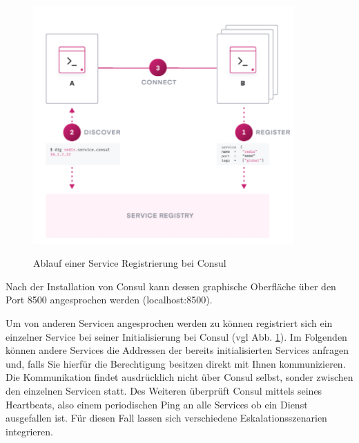 \begin{figure}[!h]
\centering
\includegraphics[width=10cm]{images/07_Consul/Consul_register.png}
\caption{Ablauf einer Service Registrierung bei Consul}
\cite{consul}
\label{fig:service_registration_consul}
\end{figure}


Nach der Installation von Consul kann dessen graphische Oberfläche über den Port 8500 angesprochen werden (localhost:8500). 

Um von anderen Servicen angesprochen werden zu können registriert sich ein einzelner Service bei seiner Initialisierung bei Consul (vgl Abb. \ref{fig:service_registration_consul}). Im Folgenden können andere Services die Addressen der bereits initialisierten Services anfragen und, falls Sie hierfür die Berechtigung besitzen direkt mit Ihnen kommunizieren. Die Kommunikation findet ausdrücklich nicht über Consul selbst, sonder zwischen den einzelnen Servicen statt. Des Weiteren überprüft Consul mittels seines Heartbeats, also einem periodischen Ping an alle Services ob ein Dienst ausgefallen ist. Für diesen Fall lassen sich verschiedene Eskalationsszenarien integrieren.

